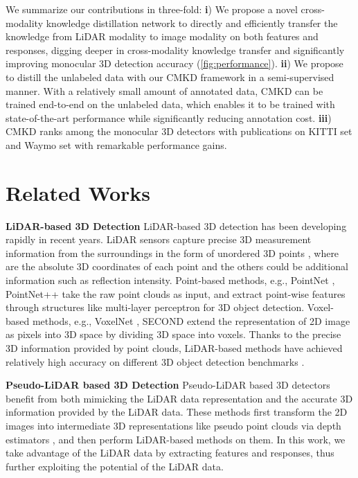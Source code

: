 \documentclass[runningheads]{llncs}
\begin{document}
We summarize our contributions in three-fold:
\textbf{i}) We propose a novel cross-modality knowledge distillation network to directly and efficiently transfer the knowledge from LiDAR modality to image modality on both features and responses,
digging deeper in cross-modality knowledge transfer and significantly improving monocular 3D detection accuracy (\cref{fig:performance}).
\textbf{ii}) We propose to distill the unlabeled data with our CMKD framework in a semi-supervised manner.
With a relatively small amount of annotated data, CMKD can be trained end-to-end on the unlabeled data, which enables it to be trained with state-of-the-art performance while significantly reducing annotation cost.
\textbf{iii}) CMKD ranks  among the monocular 3D detectors with publications on KITTI  set \cite{KITTI} and Waymo  set \cite{Waymo} with remarkable performance gains.

\section{Related Works}

\textbf{LiDAR-based 3D Detection}\quad
LiDAR-based 3D detection \cite{pvrcnn,pointrcnn,pointnet,voxelnet,li20203d,li2021anchor,li2021voxel,li2021p2v} has been developing rapidly in recent years. 
LiDAR sensors capture precise 3D measurement information from the surroundings in the form of unordered 3D points ,  where  are the absolute 3D coordinates of each point and the others could be additional information such as reflection intensity. 
Point-based methods, e.g., PointNet \cite{pointnet}, PointNet++ \cite{pointnet++} take the raw point clouds as input, and extract point-wise features through structures like multi-layer perceptron for 3D object detection. 
Voxel-based methods, e.g., VoxelNet \cite{voxelnet}, SECOND \cite{second} extend the representation of 2D image as pixels into 3D space by dividing 3D space into voxels.
Thanks to the precise 3D information provided by point clouds, LiDAR-based methods have achieved relatively high accuracy on different 3D object detection benchmarks \cite{KITTI,Waymo,nuscenes}.

\noindent\textbf{Pseudo-LiDAR based 3D Detection}\quad
Pseudo-LiDAR based 3D detectors \cite{PL,PL++,AMOD,monopl,chen2022pseudo} benefit from both mimicking the LiDAR data representation and the accurate 3D information provided by the LiDAR data.
These methods first transform the 2D images into intermediate 3D representations like pseudo point clouds via depth estimators \cite{DORN,bts}, and then perform LiDAR-based methods on them. 
In this work, we take advantage of the LiDAR data by extracting features and responses, thus further exploiting the potential of the LiDAR data.
\end{document}
